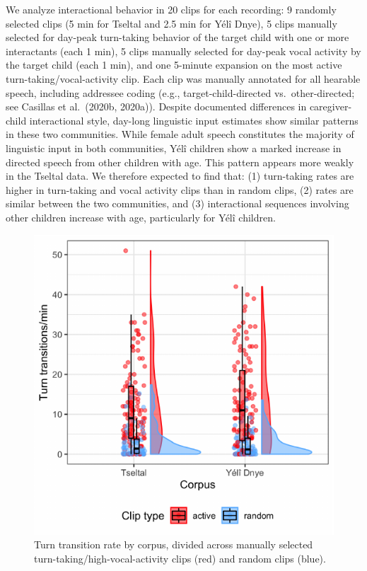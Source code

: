 \documentclass[10pt, letterpaper]{article}
\newenvironment{CodeChunk}{}{}
\begin{document}
We analyze interactional behavior in 20 clips for each recording: 9
randomly selected clips (5 min for Tseltal and 2.5 min for Yélî Dnye), 5
clips manually selected for day-peak turn-taking behavior of the target
child with one or more interactants (each 1 min), 5 clips manually
selected for day-peak vocal activity by the target child (each 1 min),
and one 5-minute expansion on the most active turn-taking/vocal-activity
clip. Each clip was manually annotated for all hearable speech,
including addressee coding (e.g., target-child-directed
vs.~other-directed; see Casillas et al.~(2020b, 2020a)). Despite
documented differences in caregiver-child interactional style, day-long
linguistic input estimates show similar patterns in these two
communities. While female adult speech constitutes the majority of
linguistic input in both communities, Yélî children show a marked
increase in directed speech from other children with age. This pattern
appears more weakly in the Tseltal data. We therefore expected to find
that: (1) turn-taking rates are higher in turn-taking and vocal activity
clips than in random clips, (2) rates are similar between the two
communities, and (3) interactional sequences involving other children
increase with age, particularly for Yélî children.

\begin{CodeChunk}
\begin{figure}[h]

{\centering \includegraphics{figs/tseyel.ttr.fig-1} 

}

\caption[Turn transition rate by corpus, divided across manually selected turn-taking/high-vocal-activity clips (red) and random clips (blue)]{Turn transition rate by corpus, divided across manually selected turn-taking/high-vocal-activity clips (red) and random clips (blue).}\label{fig:tseyel.ttr.fig}
\end{figure}
\end{CodeChunk}
\end{document}
